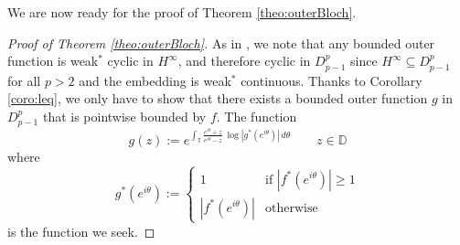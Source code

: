 \documentclass{birkjour}
\numberwithin{equation}{section}
\theoremstyle{plain}
\theoremstyle{definition}
\newcommand{\T}{\mathbb{T}}
\newcommand{\D}{\mathbb{D}}
\newcommand{\1}{\mathds{1}}
\begin{document}
We are now ready for the proof of Theorem \ref{theo:outerBloch}.

\begin{proof}[Proof of Theorem \ref{theo:outerBloch}]
As in \cite[Th. 3]{Brown91}, we note that any bounded outer function is weak$^*$ cyclic in $H^\infty$, and therefore cyclic in $D^p_{p-1}$ since $H^\infty\subseteq D^p_{p-1}$ for all $p>2$ and the embedding is weak$^*$ continuous. Thanks to Corollary \ref{coro:leq}, we only have to show that there exists a bounded outer function $g$ in $D^p_{p-1}$ that is pointwise bounded by $f$. The function 
\[
g(z):=e^{\int_\T\frac{e^{i\theta}+z}{e^{i\theta}-z}~\log|g^*(e^{i\theta})|\,d\theta}\qquad z\in\D
\]
where
\[
g^*(e^{i\theta}):=\begin{cases}
1\qquad &\text{if}\,\,|f^*(e^{i\theta})|\ge1\\
|f^*(e^{i\theta})|&\text{otherwise}
\end{cases}
\]
is the function we seek.
\end{proof}

\end{document}

